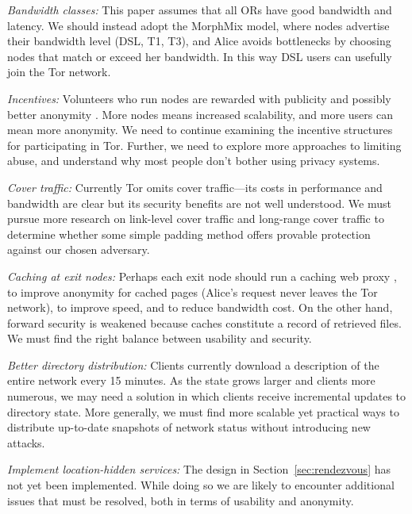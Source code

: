 \documentclass[times,10pt,twocolumn]{article}
\begin{document}
\emph{Bandwidth classes:} This paper assumes that all ORs have
good bandwidth and latency. We should instead adopt the MorphMix model,
where nodes advertise their bandwidth level (DSL, T1, T3), and
Alice avoids bottlenecks by choosing nodes that match or
exceed her bandwidth. In this way DSL users can usefully join the Tor
network.

\emph{Incentives:} Volunteers who run nodes are rewarded with publicity
and possibly better anonymity \cite{econymics}. More nodes means increased
scalability, and more users can mean more anonymity. We need to continue
examining the incentive structures for participating in Tor. Further,
we need to explore more approaches to limiting abuse, and understand
why most people don't bother using privacy systems.

\emph{Cover traffic:} Currently Tor omits cover traffic---its costs
in performance and bandwidth are clear but its security benefits are
not well understood. We must pursue more research on link-level cover
traffic and long-range cover traffic to determine whether some simple padding
method offers provable protection against our chosen adversary.


\emph{Caching at exit nodes:} Perhaps each exit node should run a
caching web proxy \cite{shsm03}, to improve anonymity for cached pages
(Alice's request never
leaves the Tor network), to improve speed, and to reduce bandwidth cost.
On the other hand, forward security is weakened because caches
constitute a record of retrieved files.  We must find the right
balance between usability and security.

\emph{Better directory distribution:}
Clients currently download a description of
the entire network every 15 minutes. As the state grows larger
and clients more numerous, we may need a solution in which
clients receive incremental updates to directory state.
More generally, we must find more
scalable yet practical ways to distribute up-to-date snapshots of
network status without introducing new attacks.

\emph{Implement location-hidden services:} The design in
Section~\ref{sec:rendezvous} has not yet been implemented.  While doing
so we are likely to encounter additional issues that must be resolved,
both in terms of usability and anonymity.
\end{document}
